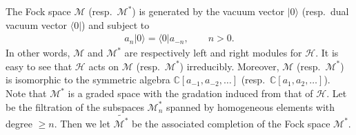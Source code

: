 \documentclass[10pt,a4paper]{amsart}
\numberwithin{equation}{section}
\begin{document}
The Fock space $\mathcal{M}$ (resp.\ $\mathcal{M}^*$) is generated by the vacuum vector $|0\rangle$ (resp.\ dual vacuum vector $\langle0|$) and
subject to
\begin{align*}
a_n|0\rangle=\langle0|a_{-n},\qquad n>0.
\end{align*}
In other words, $\mathcal{M}$ and $\mathcal{M}^*$ are respectively left and right modules for $\mathcal H$.
It is easy to see that $\mathcal{H}$ acts on $\mathcal{M}$ (resp.\ $\mathcal{M}^*$) irreducibly. Moreover, $\mathcal{M}$ (resp.\ $\mathcal{M}^*$) is isomorphic to the symmetric algebra $\mathbb{C}[a_{-1},a_{-2},\dots]$ (resp.\ $\mathbb{C}[a_1,a_2,\dots]$). Note that
$\mathcal M^*$ is a graded space with the gradation induced from that of $\mathcal H$.
Let  be the filtration of the subspaces $\mathcal M^*_n$ spanned by homogeneous elements with degree $\geq n$. Then we
let $\widetilde{\mathcal{M}^*}$ be the associated completion of the Fock space $\mathcal{M}^*$.
\end{document}

